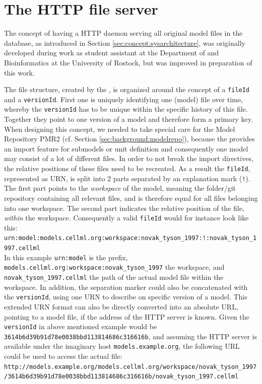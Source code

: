 
\section{The HTTP file server}
\label{sec:concept:filestorage}

The concept of having a HTTP daemon serving all original model files in the \masymos database, as introduced in Section \ref{sec:concept:sysarchitecture}, was originally developed during work as student assistant at the Department of \sysbio and Bioinformatics at the University of Rostock, but was improved in preparation of this work.

The file structure, created by the \modelcrawler, is organized around the concept of a \texttt{fileId} and a \texttt{versionId}. First one is uniquely identifying one (model) file over time, whereby the \texttt{versionId} has to be unique within the specific history of this file. Together they point to one version of a model and therefore form a primary key.
When designing this concept, we needed to take special care for the \cellml Model Repository PMR2 (cf. Section \ref{sec:background:modelrepo}), because the \cellml provides an import feature for submodels or unit definition and consequently one model may consist of a lot of different files. In order to not break the import directives, the relative positions of these files need to be recreated. As a result the \texttt{fileId}, represented as URN, is split into 2 parts separated by an explanation mark (\texttt{!}). The first part points to the \emph{workspace} of the model, meaning the folder/git repository containing all relevant files, and is therefore equal for all files belonging into one workspace. The second part indicates the relative position of the file, \emph{within} the workspace.
Consequently a valid \texttt{fileId} would for instance look like this:\\ \texttt{urn:model:models.cellml.org:workspace:novak\_tyson\_1997:!:novak\_tyson\_1997.cellml}\\
In this example \texttt{urn:model} is the prefix, \texttt{models.cellml.org:workspace:novak\_tyson\_1997} the workspace, and \texttt{novak\_tyson\_1997.cellml} the path of the actual model file within the workspace. In addition, the separation marker could also be concatenated with the \texttt{versionId}, using one URN to describe on specific version of a model. This extended URN format can also be directly converted into an absolute URL, pointing to a model file, if the address of the HTTP server is known.
Given the \texttt{versionId} in above mentioned example would be \texttt{3614b6d39b91d78e0038bbd113814686c316616b}, and assuming the HTTP server is available under the imaginary host \texttt{models.example.org}, the following URL could be used to access the actual file:\\
\texttt{http://models.example.org/models.cellml.org/workspace/novak\_tyson\_1997/3614b6d39b91d78e0038bbd113814686c316616b/novak\_tyson\_1997.cellml}

